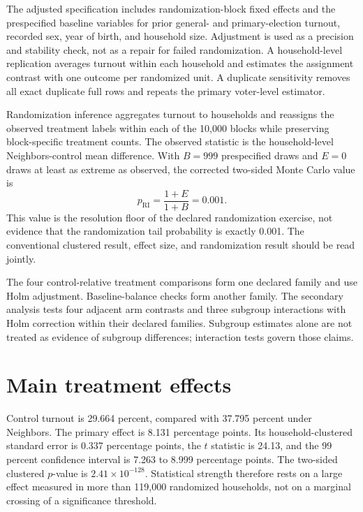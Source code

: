 \documentclass[a4paper,12pt]{article}
\begin{document}
The adjusted specification includes randomization-block fixed effects and the prespecified baseline variables for prior general- and primary-election turnout, recorded sex, year of birth, and household size. Adjustment is used as a precision and stability check, not as a repair for failed randomization. A household-level replication averages turnout within each household and estimates the assignment contrast with one outcome per randomized unit. A duplicate sensitivity removes all exact duplicate full rows and repeats the primary voter-level estimator.

Randomization inference aggregates turnout to households and reassigns the observed treatment labels within each of the 10,000 blocks while preserving block-specific treatment counts. The observed statistic is the household-level Neighbors-control mean difference. With $B=999$ prespecified draws and $E=0$ draws at least as extreme as observed, the corrected two-sided Monte Carlo value is
\begin{equation}
p_{\mathrm{RI}}=\frac{1+E}{1+B}=0.001.
\end{equation}
This value is the resolution floor of the declared randomization exercise, not evidence that the randomization tail probability is exactly 0.001. The conventional clustered result, effect size, and randomization result should be read jointly.

The four control-relative treatment comparisons form one declared family and use Holm adjustment. Baseline-balance checks form another family. The secondary analysis tests four adjacent arm contrasts and three subgroup interactions with Holm correction within their declared families. Subgroup estimates alone are not treated as evidence of subgroup differences; interaction tests govern those claims.

\section{Main treatment effects}

Control turnout is 29.664 percent, compared with 37.795 percent under Neighbors. The primary effect is 8.131 percentage points. Its household-clustered standard error is 0.337 percentage points, the $t$ statistic is 24.13, and the 99 percent confidence interval is 7.263 to 8.999 percentage points. The two-sided clustered $p$-value is $2.41\times10^{-128}$. Statistical strength therefore rests on a large effect measured in more than 119,000 randomized households, not on a marginal crossing of a significance threshold.
\end{document}
